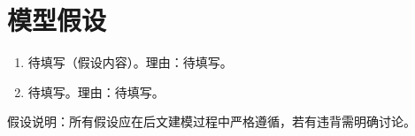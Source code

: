 \section{模型假设}\label{sec:assumptions}

\begin{enumerate}[label=\textbf{假设\arabic*:}]
    \item 待填写（假设内容）。理由：待填写。
    \item 待填写。理由：待填写。
\end{enumerate}

假设说明：所有假设应在后文建模过程中严格遵循，若有违背需明确讨论。
